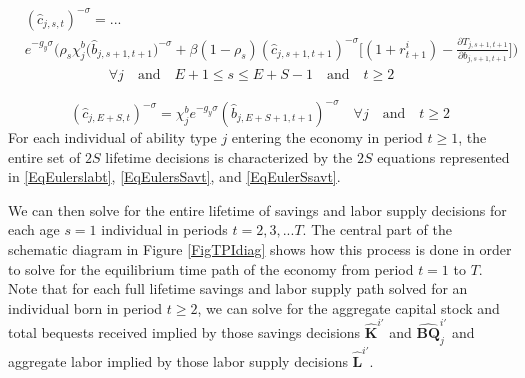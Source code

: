 \documentclass[letterpaper,12pt]{article}
\theoremstyle{definition}
\begin{document}
  \begin{equation}\label{EqEulersSavt}
    \begin{split}
      &(\hat{c}_{j,s,t})^{-\sigma} = ... \\
      &e^{-g_y\sigma}\Biggl(\rho_{s}\chi^b_j \bigl(\hat{b}_{j,s+1,t+1}\bigr)^{-\sigma} + \beta(1-\rho_{s})(\hat{c}_{j,s+1,t+1})^{-\sigma}\Biggl[(1 + r_{t+1}^i) - \frac{\partial T_{j,s+1,t+1}}{\partial b_{j,s+1,t+1}}\Biggr]\Biggr) \\
      &\qquad\qquad\qquad\forall j \quad\text{and}\quad E+1\leq s\leq E+S-1 \quad\text{and}\quad t\geq 2
    \end{split}
  \end{equation}

  \begin{equation}\label{EqEulerSsavt}
    (\hat{c}_{j,E+S,t})^{-\sigma} = \chi^b_j e^{-g_y\sigma}(\hat{b}_{j,E+S+1,t+1})^{-\sigma} \quad\forall j \quad\text{and}\quad t\geq 2
  \end{equation}
  For each individual of ability type $j$ entering the economy in period $t\geq 1$, the entire set of $2S$ lifetime decisions is characterized by the $2S$ equations represented in \eqref{EqEulerslabt}, \eqref{EqEulersSavt}, and \eqref{EqEulerSsavt}.

  We can then solve for the entire lifetime of savings and labor supply decisions for each age $s=1$ individual in periods $t=2,3,...T$. The central part of the schematic diagram in Figure \ref{FigTPIdiag} shows how this process is done in order to solve for the equilibrium time path of the economy from period $t=1$ to $T$. Note that for each full lifetime savings and labor supply path solved for an individual born in period $t\geq 2$, we can solve for the aggregate capital stock and total bequests received implied by those savings decisions $\bm{\hat{K}}^{i'}$ and $\bm{\hat{BQ}}_{j}^{i'}$ and aggregate labor implied by those labor supply decisions $\bm{\hat{L}}^{i'}$.
\end{document}
